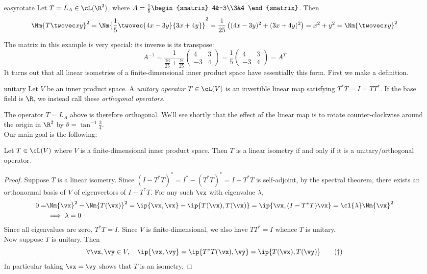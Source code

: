 \begin{example}{}{easyrotate}
Let $T=L_A\in\cL(\R^2)$, where $A=\frac 15\begin{smatrix}
4&-3\\3&4
\end{smatrix}$. Then
\[\Nm{T\twovec xy}^2=\Nm{\frac 15\twovec{4x-3y}{3x+4y}}^2=\frac 1{25}\left((4x-3y)^2+(3x+4y)^2\right)=x^2+y^2=\Nm{\twovec xy}^2\]
\end{example}

The matrix in this example is very special: its inverse is its transpose:
\[A^{-1}=\frac 1{\frac{16}{25}+\frac 9{25}}\begin{pmatrix}
4&3\\-3&4
\end{pmatrix} =\frac 1{5}\begin{pmatrix}
4&3\\-3&4
\end{pmatrix}=A^T\]
It turns out that all linear isometries of a finite-dimensional inner product space have essentially this form. First we make a definition.

\begin{defn}{}{unitary}
Let $V$ be an inner product space. A \emph{unitary operator} $T\in\cL(V)$ is an invertible linear map satisfying $T^*T=I=TT^*$. If the base field is $\R$, we instead call these \emph{orthogonal operators.}
\end{defn}

The operator $T=L_A$ above is therefore orthogonal. We'll see shortly that the effect of the linear map is to rotate counter-clockwise around the origin in $\R^2$ by $\theta=\tan^{-1}\frac 34$.\\[5pt]
Our main goal is the following:

\begin{thm}{}{}
Let $T\in\cL(V)$ where $V$ is a finite-dimensional inner product space. Then $T$ is a linear isometry if and only if it is a unitary/orthogonal operator.
\end{thm}

\begin{proof}
Suppose $T$ is a linear isometry. Since $(I-T^*T)^*=I^*-(T^*T)^*=I-T^*T$ is self-adjoint, by the spectral theorem, there exists an orthonormal basis of $V$ of eigenvectors of $I-T^*T$. For any such $\vx$ with eigenvalue $\lambda$,
\begin{align*}
0=&\Nm{\vx}^2-\Nm{T(\vx)}^2=\ip{\vx,\vx}-\ip{T(\vx),T(\vx)}=\ip{\vx,(I-T^*T)\vx}=\cl{\lambda}\Nm{\vx}^2\\
&\implies\lambda=0
\end{align*}
Since all eigenvalues are zero, $T^*T=I$. Since $V$ is finite-dimensional, we also have $TT^*=I$ whence $T$ is unitary.\\[5pt]
Now suppose $T$ is unitary. Then
\[\forall\vx,\vy\in V,\quad\ip{\vx,\vy}=\ip{T^*T(\vx),\vy}=\ip{T(\vx),T(\vy)}\tag{$\dag$}\]
In particular taking $\vx=\vy$ shows that $T$ is an isometry.
\end{proof}

